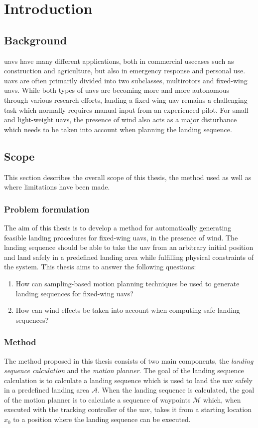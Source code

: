 \chapter{Introduction}
\acresetall
\section{Background}
\acp{uav} have many different applications, both in commercial 
usecases such as construction and agriculture, but also in emergency response and personal use. 
\acp{uav} are often primarily divided into two subclasses, multirotors and fixed-wing \acp{uav}. 
While both types of \acp{uav} are becoming more and more autonomous through various research efforts, landing a fixed-wing \ac{uav} remains a challenging task which 
normally requires manual input from an experienced pilot. For small and light-weight \acp{uav}, the presence of wind also acts as a major disturbance which needs to be taken into account when planning 
the landing sequence.
\section{Scope}
This section describes the overall scope of this thesis, the method used as well as where limitations have been made.
\subsection{Problem formulation}
The aim of this thesis is to develop a method for automatically generating feasible 
landing procedures for fixed-wing \acp{uav}, in the presence of wind. The landing sequence should be able to take the \ac{uav} 
from an arbitrary initial position and land safely in a predefined landing area while fulfilling physical constraints of the system. 
This thesis aims to answer the following questions:
\begin{enumerate}
    \item How can sampling-based motion planning techniques be used to generate landing sequences for fixed-wing \acp{uav}?
    \item How can wind effects be taken into account when computing safe landing sequences?
\end{enumerate}

\subsection{Method}
The method proposed in this thesis consists of two main components, the \textit{landing sequence calculation} and the \textit{motion planner}. The goal of the landing sequence calculation is 
to calculate a landing sequence which is used to land the \ac{uav} safely in a predefined landing area $\mathcal{A}$. When the landing sequence is calculated, the goal of the motion planner is to 
calculate a sequence of waypoints $\mathcal{M}$ which, when executed with the tracking controller of the \ac{uav}, takes it from a starting location $x_0$ to a position where the landing sequence can be executed.


